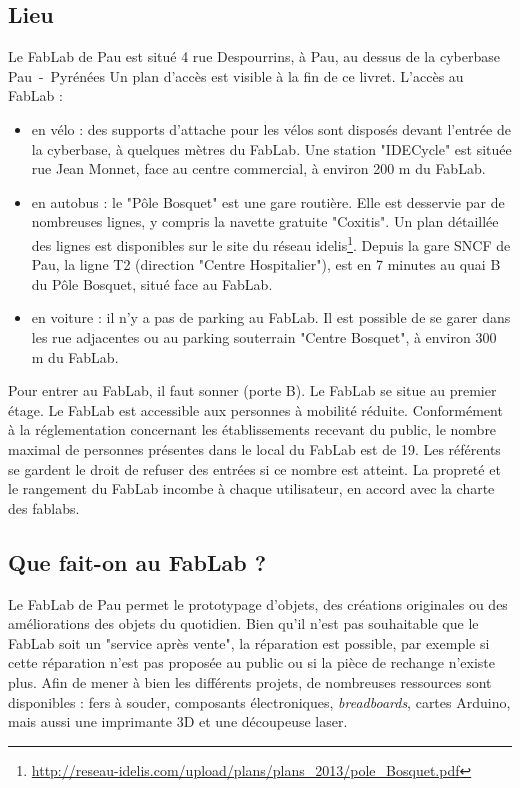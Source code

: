 \subsection{Lieu}
Le FabLab de Pau est situé 4 rue Despourrins, à Pau, au dessus de la cyberbase Pau~-~Pyrénées
Un plan d'accès est visible à la fin de ce livret.
L'accès au FabLab :
\begin{itemize}
  \item en vélo : des supports d'attache pour les vélos sont disposés devant l'entrée de la cyberbase, à quelques mètres du FabLab. Une station "IDECycle" est située rue Jean Monnet, face au centre commercial, à environ 200 m du FabLab.
  \item en autobus : le "Pôle Bosquet" est une gare routière. Elle est desservie par de nombreuses lignes, y compris la navette gratuite "Coxitis". Un plan détaillée des lignes est disponibles sur le site du réseau idelis\footnote{\url{http://reseau-idelis.com/upload/plans/plans\_2013/pole\_Bosquet.pdf}}. Depuis la gare SNCF de Pau, la ligne T2 (direction "Centre Hospitalier"), est en 7 minutes au quai B du Pôle Bosquet, situé face au FabLab.
  \item en voiture : il n'y a pas de parking au FabLab. Il est possible de se garer dans les rue adjacentes ou au parking souterrain "Centre Bosquet", à environ 300 m du FabLab.
\end{itemize}
Pour entrer au FabLab, il faut sonner (porte B). Le FabLab se situe au premier étage.
Le FabLab est accessible aux personnes à mobilité réduite.
Conformément à la réglementation concernant les établissements recevant du public, le nombre maximal de personnes présentes dans le local du FabLab est de 19. Les référents se gardent le droit de refuser des entrées si ce nombre est atteint.
La propreté et le rangement du FabLab incombe à chaque utilisateur, en accord avec la charte des fablabs.

\subsection{Que fait-on au FabLab ?}
Le FabLab de Pau permet le prototypage d'objets, des créations originales ou des améliorations des objets du quotidien.
Bien qu'il n'est pas souhaitable que le FabLab soit un "service après vente", la réparation est possible, par exemple si cette réparation n'est pas proposée au public ou si la pièce de rechange n'existe plus.
Afin de mener à bien les différents projets, de nombreuses ressources sont disponibles : fers à souder, composants électroniques, \textit{breadboards}, cartes Arduino, mais aussi une imprimante 3D et une découpeuse laser.

